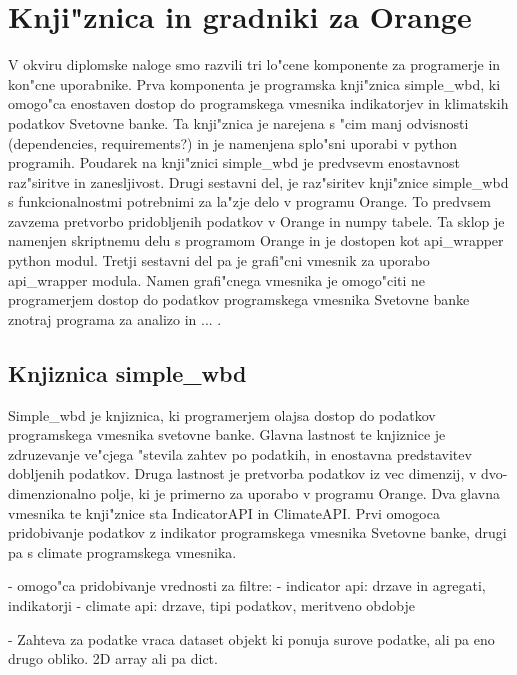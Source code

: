 \chapter{Knji"znica in gradniki za Orange}

V okviru diplomske naloge smo razvili tri lo"cene komponente za programerje in
kon"cne uporabnike. Prva komponenta je programska knji"znica simple\_wbd, ki
omogo"ca enostaven dostop do programskega vmesnika indikatorjev in klimatskih
podatkov Svetovne banke. Ta knji"znica je narejena s "cim manj odvisnosti
(dependencies, requirements?) in je namenjena splo"sni uporabi v python
programih. Poudarek na knji"znici simple\_wbd je predvsevm enostavnost 
raz"siritve in zanesljivost. Drugi sestavni del, je raz"siritev knji"znice
simple\_wbd s funkcionalnostmi potrebnimi za la"zje delo v programu Orange.
To predvsem zavzema pretvorbo pridobljenih podatkov v Orange in numpy tabele.
Ta sklop je namenjen skriptnemu delu s programom Orange in je dostopen kot
api\_wrapper python modul. Tretji sestavni del pa je grafi"cni vmesnik za
uporabo api\_wrapper modula. Namen grafi"cnega vmesnika je omogo"citi ne
programerjem dostop do podatkov programskega vmesnika Svetovne banke znotraj
programa za analizo in ... .

\section{Knjiznica simple\_wbd}

Simple\_wbd je knjiznica, ki programerjem olajsa dostop do podatkov
programskega vmesnika svetovne banke. Glavna lastnost te knjiznice je
zdruzevanje ve"cjega "stevila zahtev po podatkih, in enostavna predstavitev
dobljenih podatkov. Druga lastnost je pretvorba podatkov iz vec dimenzij, v
dvo-dimenzionalno polje, ki je primerno za uporabo v programu Orange. Dva
glavna vmesnika te knji"znice sta IndicatorAPI in ClimateAPI. Prvi omogoca
pridobivanje podatkov z indikator programskega vmesnika Svetovne banke, drugi
pa s climate programskega vmesnika.




% 

- omogo"ca pridobivanje vrednosti za filtre:
    - indicator api: drzave in agregati, indikatorji
    - climate api: drzave, tipi podatkov, meritveno obdobje 

- Zahteva za podatke vraca dataset objekt ki ponuja surove podatke, ali pa eno
  drugo obliko. 2D array ali pa dict.

